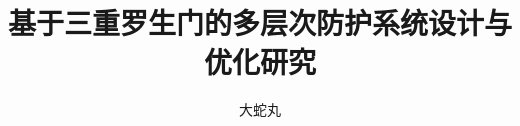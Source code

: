 \documentclass[doctor]{hnuthesis}
\title{基于三重罗生门的多层次防护系统设计与优化研究}
\author{大蛇丸}
\begin{document}
\maketitle


\tableofcontents
\begingroup
    \renewcommand*{\addvspace}[1]{}
        \listoffigures
        \newpage

        \listoftables
        \newpage
\endgroup

\mainmatter





\appendix



\backmatter

\end{document}
